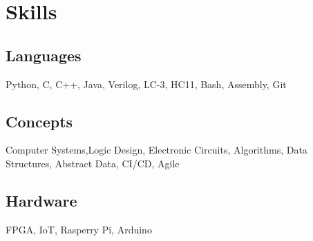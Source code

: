 \documentclass[12pt,letterpaper]{report}
\newcommand{\verticalgap}{2em}
\newcommand{\skillspace}{1em}
\newcommand{\rightcolumn}{0.18\linewidth}
\begin{document}
	\begin{minipage}[t]{\rightcolumn}
		\vspace{\verticalgap}
    \section*{Skills}
    \raggedright
    \subsection*{Languages}
        Python, C, C++, Java, Verilog, LC-3, HC11, Bash, Assembly, Git 
	\vspace{\skillspace}
	\subsection*{Concepts}
    Computer Systems,\newline Logic Design, Electronic Circuits, Algorithms, \newline Data Structures, Abstract Data, CI/CD, Agile
      \vspace{\skillspace}
    \subsection*{Hardware}
         FPGA, IoT, Rasperry Pi, Arduino
	\end{minipage}
%	
\end{document}
